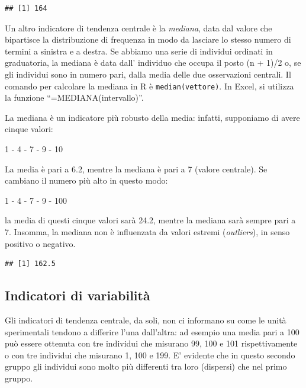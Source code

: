\documentclass[a4paper,12pt,oneside]{book}
\newenvironment{Shaded}{\begin{snugshade}}{\end{snugshade}}
\newcommand{\KeywordTok}[1]{\textcolor[rgb]{0.13,0.29,0.53}{\textbf{#1}}}
\newcommand{\OperatorTok}[1]{\textcolor[rgb]{0.81,0.36,0.00}{\textbf{#1}}}
\newcommand{\NormalTok}[1]{#1}
\begin{document}
\begin{verbatim}
## [1] 164
\end{verbatim}

Un altro indicatore di tendenza centrale è la \emph{mediana}, data dal
valore che bipartisce la distribuzione di frequenza in modo da lasciare
lo stesso numero di termini a sinistra e a destra. Se abbiamo una serie
di individui ordinati in graduatoria, la mediana è data dall' individuo
che occupa il posto (n + 1)/2 o, se gli individui sono in numero pari,
dalla media delle due osservazioni centrali. Il comando per calcolare la
mediana in R è \texttt{median(vettore)}. In Excel, si utilizza la
funzione ``=MEDIANA(intervallo)''.

La mediana è un indicatore più robusto della media: infatti, supponiamo
di avere cinque valori:

1 - 4 - 7 - 9 - 10

La media è pari a 6.2, mentre la mediana è pari a 7 (valore centrale).
Se cambiano il numero più alto in questo modo:

1 - 4 - 7 - 9 - 100

la media di questi cinque valori sarà 24.2, mentre la mediana sarà
sempre pari a 7. Insomma, la mediana non è influenzata da valori estremi
(\emph{outliers}), in senso positivo o negativo.

\begin{Shaded}
\end{Shaded}

\begin{verbatim}
## [1] 162.5
\end{verbatim}

\subsection{Indicatori di variabilità}\label{indicatori-di-variabilita}

Gli indicatori di tendenza centrale, da soli, non ci informano su come
le unità sperimentali tendono a differire l'una dall'altra: ad esempio
una media pari a 100 può essere ottenuta con tre individui che misurano
99, 100 e 101 rispettivamente o con tre individui che misurano 1, 100 e
199. E' evidente che in questo secondo gruppo gli individui sono molto
più differenti tra loro (dispersi) che nel primo gruppo.
\end{document}

